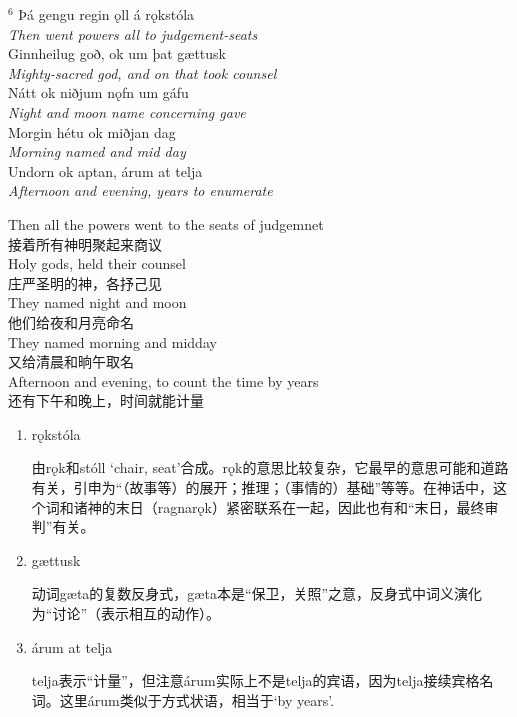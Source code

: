 \begin{paracol}{2}
    \noindent
    $^6 $ Þá gengu regin ǫll á rǫkstóla\\
    \textit{Then went powers all to judgement-seats}\\
    Ginnheilug goð, ok um þat gættusk\\
    \textit{Mighty-sacred god, and on that took counsel}\\
    Nátt ok niðjum nǫfn um gáfu\\
    \textit{Night and moon name concerning gave}\\
    Morgin hétu ok miðjan dag\\
    \textit{Morning named and mid day}\\
    Undorn ok aptan, árum at telja\\
    \textit{Afternoon and evening, years to enumerate}\\

    \switchcolumn

    \noindent
    Then all the powers went to the seats of judgemnet\\
    接着所有神明聚起来商议\\
    Holy gods, held their counsel\\
    庄严圣明的神，各抒己见\\
    They named night and moon\\
    他们给夜和月亮命名\\
    They named morning and midday\\
    又给清晨和晌午取名\\
    Afternoon and evening, to count the time by years\\
    还有下午和晚上，时间就能计量\\

\end{paracol}
\begin{grammar*}{}
    \begin{enumerate}[leftmargin=*]

        \item rǫkstóla

              由rǫk和stóll `chair, seat'合成。rǫk的意思比较复杂，它最早的意思可能和道路有关，引申为“（故事等）的展开；推理；（事情的）基础”等等。在神话中，这个词和诸神的末日（ragnarǫk）紧密联系在一起，因此也有和“末日，最终审判”有关。

        \item gættusk

              动词gæta的复数反身式，gæta本是“保卫，关照”之意，反身式中词义演化为“讨论”（表示相互的动作）。

        \item árum at telja

              telja表示“计量”，但注意árum实际上不是telja的宾语，因为telja接续宾格名词。这里árum类似于方式状语，相当于`by years'.
    \end{enumerate}
\end{grammar*}
\hspace*{\fill}\\ %

